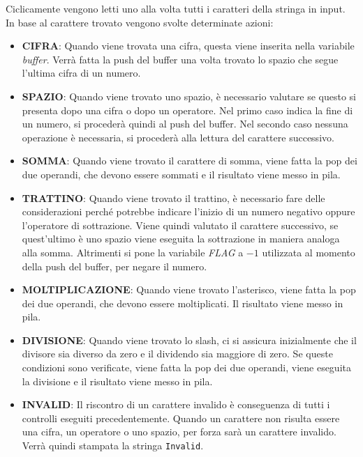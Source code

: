 \documentclass[a4paper,11pt,oneside]{book}
\begin{document}
Ciclicamente vengono letti uno alla volta tutti i caratteri della stringa in input. In base al carattere trovato vengono svolte determinate azioni:
\begin{itemize}
  \item \textbf{CIFRA}: Quando viene trovata una cifra, questa viene inserita nella variabile \emph{buffer}. Verrà fatta la push del buffer una volta trovato lo spazio che segue 
  l'ultima cifra di un numero.

  \item \textbf{SPAZIO}: Quando viene trovato uno spazio, è necessario valutare se questo si presenta dopo una cifra o dopo un operatore. Nel primo caso indica la fine di un numero,
  si procederà quindi al push del buffer. Nel secondo caso nessuna operazione è necessaria, si procederà alla lettura del carattere successivo.

  \item \textbf{SOMMA}: Quando viene trovato il carattere di somma, viene fatta la pop dei due operandi, che devono essere sommati e il risultato viene messo in pila.

  \item \textbf{TRATTINO}: Quando viene trovato il trattino, è necessario fare delle considerazioni perché potrebbe indicare l'inizio di un numero negativo oppure l'operatore di sottrazione.
  Viene quindi valutato il carattere successivo, se quest'ultimo è uno spazio viene eseguita la sottrazione in maniera analoga alla somma. Altrimenti si pone la 
  variabile \emph{FLAG} a $-1$ utilizzata al momento della push del buffer, per negare il numero.

  \item \textbf{MOLTIPLICAZIONE}: Quando viene trovato l'asterisco, viene fatta la pop dei due operandi, che devono essere moltiplicati. Il risultato viene messo in pila.

  \item \textbf{DIVISIONE}: Quando viene trovato lo slash, ci si assicura inizialmente che il divisore sia diverso da zero e il dividendo sia maggiore di zero. Se queste condizioni
  sono verificate, viene fatta la pop dei due operandi, viene eseguita la divisione e il risultato viene messo in pila.

  \item \textbf{INVALID}: Il riscontro di un carattere invalido è conseguenza di tutti i controlli eseguiti precedentemente. Quando un carattere non risulta essere 
  una cifra, un operatore o uno spazio, per forza sarà un carattere invalido. Verrà quindi stampata la stringa \verb|Invalid|.
\end{itemize}
\end{document}
